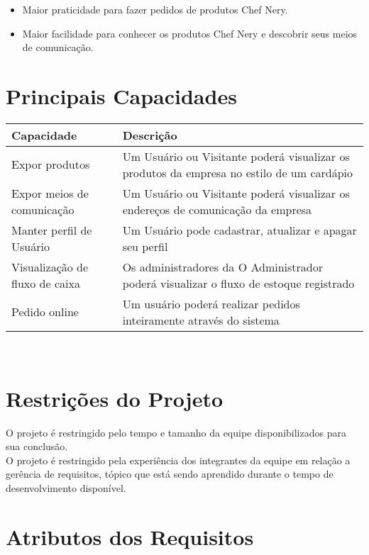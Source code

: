 \begin{apendicesenv}
\begin{itemize}
\item Maior praticidade para fazer pedidos de produtos Chef Nery.
\item Maior facilidade para conhecer os produtos Chef Nery e descobrir seus meios de comunicação.

\end{itemize}




{\large {\section { Principais Capacidades\\ } } }

\begin{tabular}{|l|p{3in}|}
  \hline
  \textbf{Capacidade} & \textbf{Descrição} \\ \hline
  Expor produtos & Um Usuário ou Visitante poderá visualizar os produtos da empresa no estilo de um cardápio \\ \hline
  Expor meios de comunicação & Um Usuário ou Visitante poderá visualizar os endereços de comunicação da empresa \\ \hline
  Manter perfil de Usuário & Um Usuário pode cadastrar, atualizar e apagar seu perfil \\ \hline
  Visualização de fluxo de caixa & Os administradores da O Administrador poderá visualizar o fluxo de estoque registrado \\ \hline
  Pedido online & Um usuário poderá realizar pedidos inteiramente através do sistema \\ \hline

\end{tabular}
\tab \\

{\large {\section { Restrições do Projeto\\ } } }

O projeto é restringido pelo tempo e tamanho da equipe disponibilizados para sua conclusão.\\
\tab O projeto é restringido pela experiência dos integrantes da equipe em relação a gerência de requisitos, tópico que está sendo aprendido durante o tempo de desenvolvimento disponível.\\
{\large {\section { Atributos dos Requisitos\\ } } }


\end{apendicesenv}
